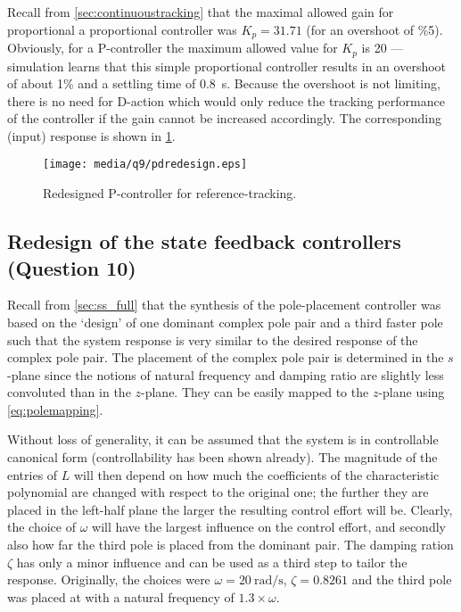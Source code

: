 Recall from \cref{sec:continuoustracking} that the maximal allowed gain for proportional a proportional controller was $K_p = 31.71$ (for an overshoot of \%5). Obviously, for a P-controller the maximum allowed value for $K_p$ is 20 --- simulation learns that this simple proportional controller results in an overshoot of about 1\% and a settling time of \SI{0.8}{\second}. Because the overshoot is not limiting, there is no need for D-action which would only reduce the tracking performance of the controller if the gain cannot be increased accordingly. The corresponding (input) response is shown in \cref{fig:q9_pdredesign}.
\begin{figure}[ht]
    \centering
    \texttt{[image: media/q9/pdredesign.eps]}
    \caption{Redesigned P-controller for reference-tracking.}
    \label{fig:q9_pdredesign}
\end{figure}
\FloatBarrier

\subsection{Redesign of the state feedback controllers \textnormal{\phantom{xxx}(Question 10)}}
\label{sec:retunepolep}
Recall from \cref{sec:ss_full} that the synthesis of the pole-placement controller was based on the `design' of one dominant complex pole pair and a third faster pole such that the system response is very similar to the desired response of the complex pole pair. The placement of the complex pole pair is determined in the $s$-plane since the notions of natural frequency and damping ratio are slightly less convoluted than in the $z$-plane. They can be easily mapped to the $z$-plane using \cref{eq:polemapping}.

Without loss of generality, it can be assumed that the system is in controllable canonical form (controllability has been shown already). The magnitude of the entries of $L$ will then depend on how much the coefficients of the characteristic polynomial are changed with respect to the original one; the further they are placed in the left-half plane the larger the resulting control effort will be. Clearly, the choice of $\omega$ will have the largest influence on the control effort, and secondly also how far the third pole is placed from the dominant pair. The damping ration $\zeta$ has only a minor influence and can be used as a third step to tailor the response. Originally, the choices were $\omega = \SI{20}{\radian\per\second}$, $\zeta = 0.8261$ and the third pole was placed at with a natural frequency of $1.3\times\omega$.


